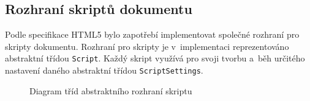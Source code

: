 \subsection{Rozhraní skriptů dokumentu}
\label{Chapter.Implementation.ScriptInterface}

Podle specifikace HTML5 bylo zapotřebí implementovat společné rozhraní pro skripty dokumentu. Rozhraní pro skripty je v~implementaci reprezentováno abstraktní třídou \texttt{Script}. Každý skript využívá pro svoji tvorbu a~běh určitého nastavení daného abstraktní třídou \texttt{ScriptSettings}. 

\begin{figure}[H]
  \begin{center}
    \caption{Diagram tříd abstraktního rozhraní skriptu}
    \label{Figure.ScriptInterface}
  \end{center}
\end{figure}

